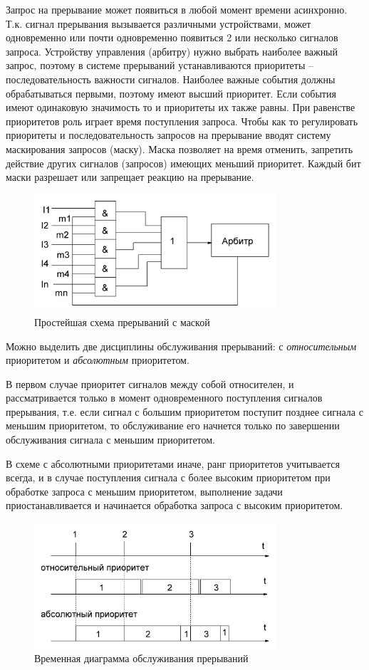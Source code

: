 \documentclass[unicode, 12pt, a4paper, oneside]{article}
\begin{document}
Запрос на прерывание может появиться в любой момент времени асинхронно. Т.к. сигнал прерывания вызывается различными устройствами, может одновременно или почти одновременно появиться 2 или несколько сигналов запроса. Устройству управления (арбитру) нужно выбрать наиболее важный запрос, поэтому в системе прерываний устанавливаются приоритеты – последовательность важности сигналов. Наиболее важные события должны обрабатываться первыми, поэтому имеют высший приоритет. Если события имеют одинаковую значимость то и приоритеты их также равны. При равенстве приоритетов роль играет время поступления запроса. Чтобы как то регулировать приоритеты и последовательность запросов на прерывание вводят систему маскирования запросов (маску). Маска позволяет на время отменить, запретить действие других сигналов (запросов) имеющих меньший приоритет. Каждый бит маски разрешает или запрещает реакцию на прерывание.   
\begin{figure}[H]
\centering
\includegraphics[width=0.8\textwidth]{112_Prosta_cxema.JPG}
\caption{Простейшая схема прерываний с маской}
\end{figure}

Можно выделить две дисциплины обслуживания прерываний: с \textit{относительным} приоритетом и \textit{абсолютным} приоритетом.

В первом случае приоритет сигналов между собой относителен, и рассматривается только в момент одновременного поступления сигналов прерывания, т.е. если сигнал с большим приоритетом поступит позднее сигнала с меньшим приоритетом, то обслуживание его начнется только по завершении обслуживания сигнала с меньшим приоритетом.

В схеме с абсолютными приоритетами иначе, ранг приоритетов учитывается всегда, и в случае поступления сигнала с более высоким приоритетом при обработке запроса с меньшим приоритетом, выполнение задачи приостанавливается и начинается обработка запроса с высоким приоритетом.
\begin{figure}[H]
\centering
\includegraphics[width=0.8\textwidth]{112_Vrem_prer.JPG}
\caption{Временная диаграмма обслуживания прерываний}
\end{figure}
\end{document}
